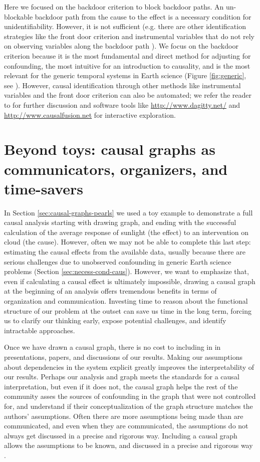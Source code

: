 \documentclass[12pt]{article}
\begin{document}
Here we focused on the backdoor criterion to block backdoor paths. An
un-blockable backdoor path from the cause to the effect is a necessary
condition for unidentifiability. However, it is not sufficient
(e.g. there are other identification strategies like the front door
criterion and instrumental variables that do not rely on observing
variables along the backdoor path \citep{pearl2009causality}). We
focus on the backdoor criterion because it is the most fundamental and
direct method for adjusting for confounding, the most intuitive for an
introduction to causality, and is the most relevant for the generic
temporal systems in Earth science (Figure \ref{fig:generic}, see
\citet{tian2002general}).  However, causal identification through
other methods like instrumental variables and the front door
criterion can also be automated; we refer the reader to
\citet{pearl2009causality} for further discussion and software
tools like \url{http://www.dagitty.net/} and
\url{http://www.causalfusion.net} for interactive exploration.


\section{Beyond toys: causal graphs as communicators, organizers, and
  time-savers}\label{sec:causal-graphs-as}

In Section \ref{sec:causal-graphs-pearls} we used a toy example to
demonstrate a full causal analysis starting with drawing graph, and
ending with the successful calculation of the average response of
sunlight (the effect) to an intervention on cloud (the
cause). However, often we may not be able to complete this last step:
estimating the causal effects from the available data, usually because
there are serious challenges due to unobserved confounding in generic
Earth science problems (Section \ref{sec:necess-cond-caus}). However,
we want to emphasize that, even if calculating a causal effect is
ultimately impossible, drawing a causal graph at the beginning of an
analysis offers tremendous benefits in terms of organization and
communication. Investing time to reason about the functional structure
of our problem at the outset can save us time in the long term,
forcing us to clarify our thinking early, expose potential challenges,
and identify intractable approaches.

Once we have drawn a causal graph, there is no cost to including in in
presentations, papers, and discussions of our results. Making our
assumptions about dependencies in the system explicit greatly improves
the interpretability of our results. Perhaps our analysis and graph
meets the standards for a causal interpretation, but even if it does
not, the causal graph helps the rest of the community asses the
sources of confounding in the graph that were not controlled for, and
understand if their conceptualization of the graph structure matches
the authors' assumptions. Often there are more assumptions being made
than are communicated, and even when they are communicated, the
assumptions do not always get discussed in a precise and rigorous
way. Including a causal graph allows the assumptions to be known, and
discussed in a precise and rigorous way \citep{hannart-da}.
\end{document}
